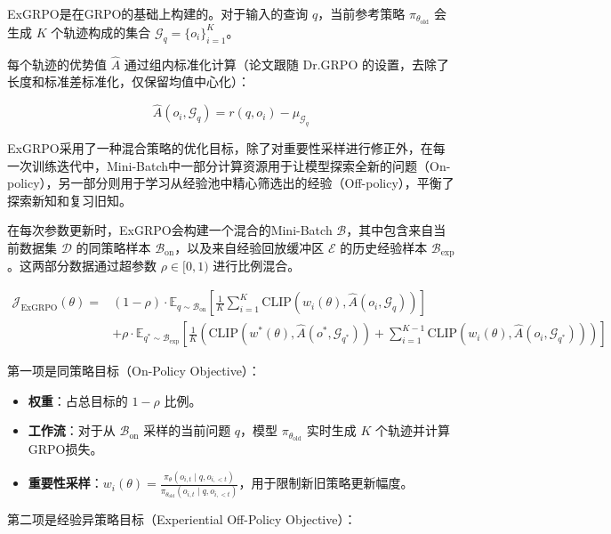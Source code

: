 ExGRPO是在GRPO的基础上构建的。对于输入的查询 \(q\)，当前参考策略 \(\pi_{\theta_{\mathrm{old}}}\) 会生成 \(K\) 个轨迹构成的集合 \(\mathcal{G}_q=\{o_i\}_{i=1}^{K}\)。

每个轨迹的优势值 \(\hat{A}\) 通过组内标准化计算（论文跟随 Dr.GRPO 的设置，去除了长度和标准差标准化，仅保留均值中心化）：

\[
\hat{A}(o_i,\mathcal{G}_q)=r(q,o_i)-\mu_{\mathcal{G}_q}
\]

ExGRPO采用了一种混合策略的优化目标，除了对重要性采样进行修正外，在每一次训练迭代中，Mini-Batch中一部分计算资源用于让模型探索全新的问题（On-policy），另一部分则用于学习从经验池中精心筛选出的经验（Off-policy），平衡了探索新知和复习旧知。

在每次参数更新时，ExGRPO会构建一个混合的Mini-Batch \(\mathcal{B}\)，其中包含来自当前数据集 \(\mathcal{D}\) 的同策略样本 \(\mathcal{B}_{\mathrm{on}}\)，以及来自经验回放缓冲区 \(\mathcal{E}\) 的历史经验样本 \(\mathcal{B}_{\mathrm{exp}}\)。这两部分数据通过超参数 \(\rho\in[0,1)\) 进行比例混合。

\[
\begin{aligned}
\mathcal{J}_{\mathrm{ExGRPO}}(\theta)
=&(1-\rho)\cdot
\mathbb{E}_{q\sim\mathcal{B}_{\mathrm{on}}}
\left[
\frac{1}{K}\sum_{i=1}^{K}
\mathrm{CLIP}\left(w_i(\theta),\hat{A}(o_i,\mathcal{G}_q)\right)
\right] \\
&+\rho\cdot
\mathbb{E}_{q^{\ast}\sim\mathcal{B}_{\mathrm{exp}}}
\left[
\frac{1}{K}
\left(
\mathrm{CLIP}\left(w^{\ast}(\theta),\hat{A}(o^{\ast},\mathcal{G}_{q^{\ast}})\right)
+\sum_{i=1}^{K-1}
\mathrm{CLIP}\left(w_i(\theta),\hat{A}(o_i,\mathcal{G}_{q^{\ast}})\right)
\right)
\right]
\end{aligned}
\]

第一项是同策略目标（On-Policy Objective）：

\begin{itemize}
\tightlist
\item
  \textbf{权重}：占总目标的 \(1-\rho\) 比例。
\item
  \textbf{工作流}：对于从 \(\mathcal{B}_{\mathrm{on}}\) 采样的当前问题 \(q\)，模型 \(\pi_{\theta_{\mathrm{old}}}\) 实时生成 \(K\) 个轨迹并计算GRPO损失。
\item
  \textbf{重要性采样}：\(w_i(\theta)=\frac{\pi_\theta(o_{i,t}\mid q,o_{i,\lt t})}{\pi_{\theta_{\mathrm{old}}}(o_{i,t}\mid q,o_{i,\lt t})}\)，用于限制新旧策略更新幅度。
\end{itemize}

第二项是经验异策略目标（Experiential Off-Policy Objective）：

